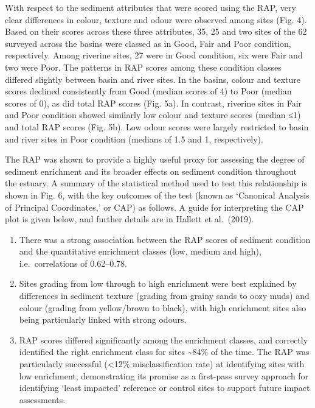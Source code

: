 \documentclass[
]{book}
\begin{document}
With respect to the sediment attributes that were scored using the RAP, very clear differences in colour, texture and odour were observed among sites (Fig. 4). Based on their scores across these three attributes, 35, 25 and two sites of the 62 surveyed across the basins were classed as in Good, Fair and Poor condition, respectively. Among riverine sites, 27 were in Good condition, six were Fair and two were Poor. The patterns in RAP scores among these condition classes differed slightly between basin and river sites. In the basins, colour and texture scores declined consistently from Good (median scores of 4) to Poor (median scores of 0), as did total RAP scores (Fig. 5a). In contrast, riverine sites in Fair and Poor condition showed similarly low colour and texture scores (median ≤1) and total RAP scores (Fig. 5b). Low odour scores were largely restricted to basin and river sites in Poor condition (medians of 1.5 and 1, respectively).

The RAP was shown to provide a highly useful proxy for assessing the degree of sediment enrichment and its broader effects on sediment condition throughout the estuary. A summary of the statistical method used to test this relationship is shown in Fig. 6, with the key outcomes of the test (known as `Canonical Analysis of Principal Coordinates,' or CAP) as follows. A guide for interpreting the CAP plot is given below, and further details are in Hallett et al.~(2019).

\begin{enumerate}
\def\labelenumi{\arabic{enumi}.}
\item
  There was a strong association between the RAP scores of sediment condition and the quantitative enrichment classes (low, medium and high), i.e.~correlations of 0.62--0.78.
\item
  Sites grading from low through to high enrichment were best explained by differences in sediment texture (grading from grainy sands to oozy muds) and colour (grading from yellow/brown to black), with high enrichment sites also being particularly linked with strong odours.
\item
  RAP scores differed significantly among the enrichment classes, and correctly identified the right enrichment class for sites \textasciitilde84\% of the time. The RAP was particularly successful (\textless12\% misclassification rate) at identifying sites with low enrichment, demonstrating its promise as a first-pass survey approach for identifying `least impacted' reference or control sites to support future impact assessments.
\end{enumerate}
\end{document}
